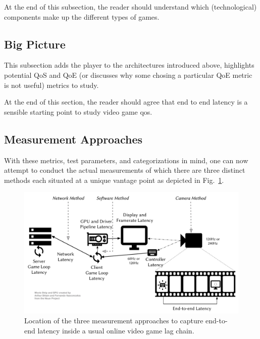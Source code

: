 At the end of this subsection, the reader should understand which (technological) components make up the different types of games.

\subsection{Big Picture}

This subsection adds the player to the architectures introduced above, highlights potential QoS and QoE (or discusses why some chosing a particular QoE metric is not useful) metrics to study.


At the end of this section, the reader should agree that end to end latency is a sensible starting point to study video game qos.


\subsection{Measurement Approaches}
\label{sec:measurementapproaches}

With these metrics, test parameters, and categorizations in mind, one can now attempt to conduct the actual measurements of which there are three distinct methods each situated at a unique vantage point as depicted in Fig.~\ref{fig:measurement-methods}.

\begin{figure}[!t]
    \centering
    \includegraphics[width=1.0\columnwidth]{../models/e2e-lag.pdf}
    \caption{Location of the three measurement approaches to capture end-to-end latency inside a usual online video game lag chain.}
\label{fig:measurement-methods}
\end{figure}



